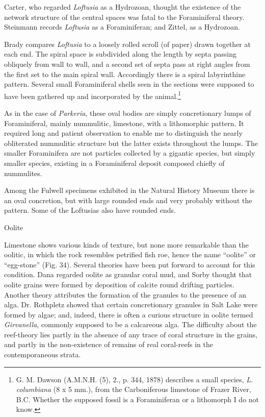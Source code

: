 \documentclass[a4paper, 12pt, oneside]{article}
\begin{document}
Carter, who regarded \emph{Loftusia} as a Hydrozoan, thought the existence of the network structure of the central spaces was fatal to the Foraminiferal theory. Steinmann records \emph{Loftusia} as a Foraminiferan; and Zittel, as a Hydrozoan.

Brady compares \emph{Loftusia} to a loosely rolled scroll (of paper) drawn together at each end. The spiral space is subdivided along the length by septa passing obliquely from wall to wall, and a second set of septa pass at right angles from the first set to the main spiral wall. Accordingly there is a spiral labyrinthine pattern. Several small Foraminiferal shells seen in the sections were supposed to have been gathered up and incorporated by the animal.\footnote{G. M. Dawson (A.M.N.H. (5), 2., p. 344, 1878) describes a small species, \emph{L. columbiana} (8 x 5 mm.), from the Carboniferous limestone of Frazer River, B.C. Whether the supposed fossil is a Foraminiferan or a lithomorph I do not know.}

As in the case of \emph{Parkeria}, these oval bodies are simply concretionary lumps of Foraminiferal, mainly nummulitic, limestone, with a lithomorphic pattern. It required long and patient observation to enable me to distinguish the nearly obliterated nummulitic structure but the latter exists throughout the lumps. The smaller Foraminifera are not particles collected by a gigantic species, but simply smaller species, existing in a Foraminiferal deposit composed chiefly of nummulites.

Among the Fulwell specimens exhibited in the Natural History Museum there is an oval concretion, but with large rounded ends and very probably without the pattern. Some of the Loftusias also have rounded ends.

Oolite

Limestone shows various kinds of texture, but none more remarkable than the oolitic, in which the rock resembles petrified fish roe, hence the name ``oolite'' or ``egg-stone'' (Fig. 34). Several theories have been put forward to account for this condition. Dana regarded oolite as granular coral mud, and Sorby thought that oolite grains were formed by deposition of calcite round drifting particles. Another theory attributes the formation of the granules to the presence of an alga. Dr. Rothpletz showed that certain concretionary granules in Salt Lake were formed by algae; and, indeed, there is often a curious structure in oolite termed \emph{Girvanella}, commonly supposed to be a calcareous alga. The difficulty about the reef-theory lies partly in the absence of any trace of coral structure in the grains, and partly in the non-existence of remains of real coral-reefs in the contemporaneous strata.
\end{document}
